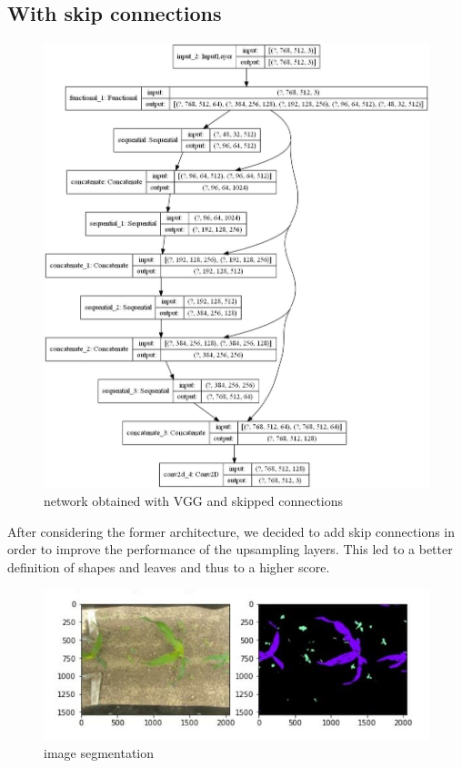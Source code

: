 \documentclass[12pt,a4paper]{report}
\begin{document}
	\subsection{With skip connections}
\begin{figure}[H]
	\includegraphics[scale = .45, center]{vgg_model}
	\caption{network obtained with VGG and skipped connections}
\end{figure}
After considering the former architecture, we decided to add skip connections in order to improve the performance of the upsampling layers. This led to a better definition of shapes and leaves and thus to a higher score.
\begin{figure}[H]
	\includegraphics[scale = .75, center]{vgg_upsampling_with}
	\caption{image segmentation}
\end{figure}
\end{document}
